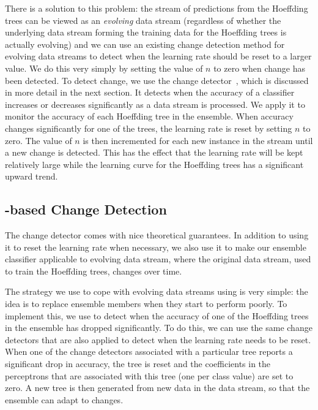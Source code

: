 There is a solution to this problem: the stream of predictions from
the Hoeffding trees can be viewed as an {\it evolving} data stream
(regardless of whether the underlying data stream forming the training
data for the Hoeffding trees is actually evolving) and we can use an
existing change detection method for evolving data streams to detect
when the learning rate should be reset to a larger value. We do this
very simply by setting the value of $n$ to zero when change has been
detected. To detect change, we use the \adwin change
detector~\cite{bif-gav}, which is discussed in more detail in the next
section. It detects when the accuracy of a classifier increases or
decreases significantly as a data stream is processed. We apply it to
monitor the accuracy of each Hoeffding tree in the ensemble. When
accuracy changes significantly for one of the trees, the learning
rate is reset by setting $n$ to zero. The value of $n$ is then
incremented for each new instance in the stream until a new change is
detected. This has the effect that the learning rate will be kept
relatively large while the learning curve for the Hoeffding trees has
a significant upward trend.

\subsection{\adwinb-based Change Detection}

The \adwin change detector comes with nice theoretical guarantees. In
addition to using it to reset the learning rate when necessary, we
also use it to make our ensemble classifier applicable to evolving
data stream, where the original data stream, used to train the
Hoeffding trees, changes over time.

The strategy we use to cope with evolving data streams using \adwin is
very simple: the idea is to replace ensemble members when
they start to perform poorly.  To implement this, we use \adwin to
detect when the accuracy of one of the Hoeffding trees in the ensemble
has dropped significantly.  To do this, we can use the same \adwin change
detectors that are also applied to detect when the learning rate needs
to be reset.  When one of the change detectors associated
with a particular tree reports a significant drop in accuracy, the
tree is reset and the coefficients in the perceptrons that are
associated with this tree (one per class value) are set to zero. A new
tree is then generated from new data in the data stream, so that the
ensemble can adapt to changes.

